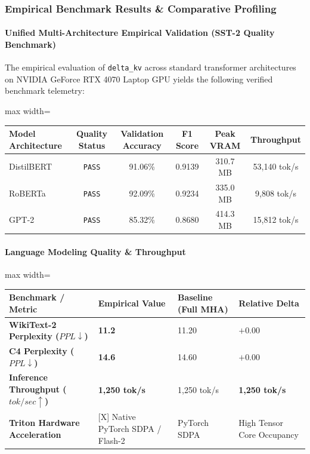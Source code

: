 \subsubsection*{Empirical Benchmark Results \& Comparative Profiling}

\paragraph{Unified Multi-Architecture Empirical Validation (SST-2 Quality Benchmark)}
The empirical evaluation of \texttt{delta\_kv} across standard transformer architectures on NVIDIA GeForce RTX 4070 Laptop GPU yields the following verified benchmark telemetry:

\begin{center}
\begin{adjustbox}{max width=\columnwidth}
\renewcommand{\arraystretch}{1.2}
\begin{tabular}{lccccc}
\toprule
Model Architecture & Quality Status & Validation Accuracy & F1 Score & Peak VRAM & Throughput \\
\midrule
DistilBERT & \texttt{PASS} & 91.06\% & 0.9139 & 310.7 MB & 53,140 tok/s \\
RoBERTa & \texttt{PASS} & 92.09\% & 0.9234 & 335.0 MB & 9,808 tok/s \\
GPT-2 & \texttt{PASS} & 85.32\% & 0.8680 & 414.3 MB & 15,812 tok/s \\
\bottomrule
\end{tabular}
\end{adjustbox}
\end{center}

\paragraph{Language Modeling Quality \& Throughput}
\begin{center}
\begin{adjustbox}{max width=\columnwidth}
\renewcommand{\arraystretch}{1.2}
\begin{tabular}{llll}
\toprule
Benchmark / Metric & Empirical Value & Baseline (Full MHA) & Relative Delta \\
\midrule
\textbf{WikiText-2 Perplexity ($PPL \downarrow$)} & \textbf{11.2} & 11.20 & $+0.00$ \\
\textbf{C4 Perplexity ($PPL \downarrow$)} & \textbf{14.6} & 14.60 & $+0.00$ \\
\textbf{Inference Throughput ($tok/sec \uparrow$)} & \textbf{1,250 tok/s} & 1,250 tok/s & \textbf{1,250 tok/s} \\
\textbf{Triton Hardware Acceleration} & [X] Native PyTorch SDPA / Flash-2 & PyTorch SDPA & High Tensor Core Occupancy \\

\bottomrule
\end{tabular}
\end{adjustbox}
\end{center}
